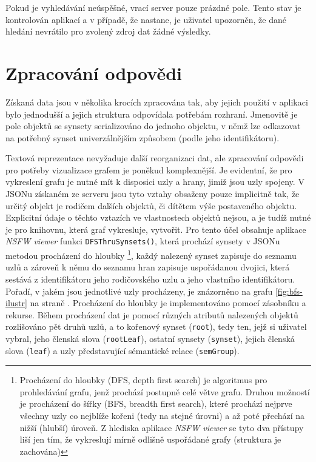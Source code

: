 \documentclass[a4paper, 11pt, oneside]{book}
\newcommand{\simplywn}{\textit{NSFW viewer} }
\begin{document}
					Pokud je vyhledávání neúspěšné, vrací server pouze prázdné pole. Tento stav je kontrolován aplikací a v případě, že nastane, je uživatel upozorněn, že dané hledání nevrátilo pro zvolený zdroj dat žádné výsledky. 

			\section{Zpracování odpovědi}
			\label{cha:zpracovani}

				Získaná data jsou v několika krocích zpracována tak, aby jejich použití v aplikaci bylo jednodušší a jejich struktura odpovídala potřebám rozhraní. Jmenovitě je pole objektů se synsety serializováno do jednoho objektu, v němž lze odkazovat na potřebný synset univerzálnějším způsobem (podle jeho identifikátoru). 

				Textová reprezentace nevyžaduje další reorganizaci dat, ale zpracování odpovědi pro potřeby vizualizace grafem je poněkud komplexnější. Je evidentní, že pro vykreslení grafu je nutné mít k disposici uzly a hrany, jimiž jsou uzly spojeny. V JSONu získaném ze serveru jsou tyto vztahy obsaženy pouze implicitně tak, že určitý objekt je rodičem dalších objektů, či dítětem výše postaveného objektu. Explicitní údaje o těchto vztazích ve vlastnostech objektů nejsou, a je tudíž nutné je pro knihovnu, která graf vykresluje, vytvořit. Pro tento účel obsahuje aplikace \simplywn funkci \texttt{DFSThruSynsets()}, která prochází synsety v JSONu metodou procházení do hloubky%
				\footnote{Procházení do hloubky (DFS, depth first search) je algoritmus pro prohledávání grafu, jenž prochází postupně celé větve grafu.  Druhou možností je procházení do šířky (BFS, breadth first search), které prochází nejprve všechny uzly co nejblíže kořeni (tedy na stejné úrovni) a až poté přechází na nižší (hlubší) úroveň. \parencite{epstein1996ics} Z hlediska aplikace \simplywn se tyto dva přístupy liší jen tím, že vykreslují mírně odlišně uspořádané grafy (struktura je zachována)}, každý nalezený synset zapisuje do seznamu uzlů a zároveň k němu do seznamu hran zapisuje uspořádanou dvojici, která sestává z identifikátoru jeho rodičovského uzlu a jeho vlastního identifikátoru. Pořadí, v jakém jsou jednotlivé uzly procházeny, je znázorněno na grafu \ref{fig:bfs-ilustr} na straně \pageref{fig:bfs-ilustr}. Procházení do hloubky je implementováno pomocí zásobníku a rekurse. Během procházení dat je pomocí různých atributů nalezených objektů rozlišováno pět druhů uzlů, a to kořenový synset (\texttt{root}), tedy ten, jejž si uživatel vybral, jeho členská slova (\texttt{rootLeaf}), ostatní synsety (\texttt{synset}), jejich členská slova (\texttt{leaf}) a uzly představující sémantické relace (\texttt{semGroup}). 
\end{document}

